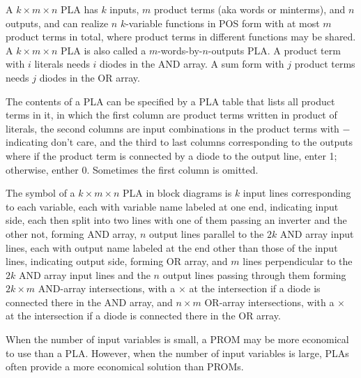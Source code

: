 \documentclass[a4paper,12pt]{article}
\begin{document}
\begin{itemize}
\begin{itemize}
\begin{itemize}
\begin{itemize}
\begin{itemize}
\begin{itemize}
\begin{itemize}
A $k\times m\times n$ PLA has $k$ inputs, $m$ product terms (aka words or minterms), and $n$ outputs, and can realize $n$ $k$-variable functions in POS form with at most $m$ product terms in total, where product terms in different functions may be shared. A $k\times m\times n$ PLA is also called a $m$-words-by-$n$-outputs PLA. A product term with $i$ literals needs $i$ diodes in the AND array. A sum form with $j$ product terms needs $j$ diodes in the OR array.

The contents of a PLA can be specified by a PLA table that lists all product terms in it, in which the first column are product terms written in product of literals, the second columns are input combinations in the product terms with $-$ indicating don't care, and the third to last columns corresponding to the outputs where if the product term is connected by a diode to the output line, enter 1; otherwise, enther 0. Sometimes the first column is omitted.

The symbol of a $k\times m\times n$ PLA in block diagrams is $k$ input lines corresponding to each variable, each with variable name labeled at one end, indicating input side, each then split into two lines with one of them passing an inverter and the other not, forming AND array, $n$ output lines parallel to the $2k$ AND array input lines, each with output name labeled at the end other than those of the input lines, indicating output side, forming OR array, and $m$ lines perpendicular to the $2k$ AND array input lines and the $n$ output lines passing through them forming $2k\times m$ AND-array intersections, with a $\times$ at the intersection if a diode is connected there in the AND array, and $n\times m$ OR-array intersections, with a $\times$ at the intersection if a diode is connected there in the OR array.

When the number of input variables is small, a PROM may be more economical to use than a PLA. However, when the number of input variables is large, PLAs often provide a more economical solution than PROMs.


\end{itemize}
\end{itemize}
\end{itemize}
\end{itemize}
\end{itemize}
\end{itemize}
\end{itemize}
\end{document}
